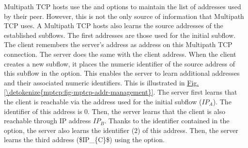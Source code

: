 \documentclass[letterpaper,10pt,english]{sphinxmanual}
\begin{document}
\sphinxAtStartPar
Multipath TCP hosts use the  and  options to maintain the list of addresses used by their peer. However, this is not the only source of information that Multipath TCP uses. A Multipath TCP hosts also learns the source addresses of the established subflows. The first addresses are those used for the initial subflow. The client remembers the server’s address as address  on this Multipath TCP connection. The server does the same with the client address. When the client creates a new subflow, it places the numeric identifier of the source address of this subflow in the  option. This enables the server to learn additional addresses and their associated numeric identifiers. This is illustrated in \hyperref[\detokenize{mptcp:fig-mptcp-addr-management}]{Fig.\@ \ref{\detokenize{mptcp:fig-mptcp-addr-management}}}. The server first learns that the client is reachable via the address used for the initial subflow (\(IP_{A}\)). The identifier of this address is \(0\). Then, the server learns that the client is also reachable through IP address \(IP_{B}\). Thanks to the identifier contained in the  option, the server also learns the identifier (\(2\)) of this address. Then, the server learns the third address (\$IP\_\{C\}\$) using the  option.
\end{document}
